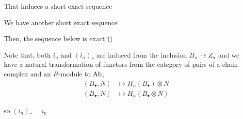 \begin{longproof}
	That induces a short exact sequence
	
	\begin{center}
	\end{center}
	
	We have another short exact sequence
	
	\begin{center}
	\end{center}
	
	Then, the sequence below is exact ()
	\begin{center}
	\end{center}
	
	Note that, both $i_n$ and $(i_n)_*$ are induced from the inclusion $B_n \to Z_n$ and we have a natural transformation of functors from the category of pairs of a chain complex and an $R$-module to $\operatorname{Ab}$,
	\begin{align*}
		(B_\bullet, N) &\mapsto H_n(B_\bullet) \otimes N \\
		(B_\bullet, N) &\mapsto H_n(B_\bullet \otimes N)
	\end{align*}
	
	so $(i_n)_* = i_n$
	
	
	\begin{center}
	\end{center}
	

\end{longproof}
